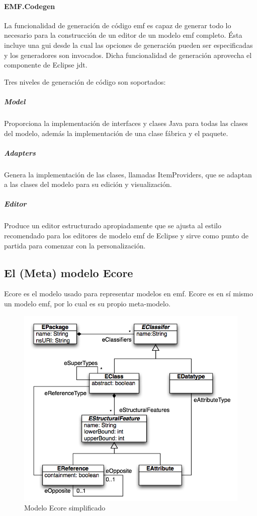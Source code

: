 \documentclass[a4paper,12pt,oneside,spanish]{book}
\begin{document}
\paragraph{EMF.Codegen}

La funcionalidad de generación de código \gls{emf} es capaz de generar todo lo necesario para la construcción de un editor de un modelo \gls{emf} completo. Ésta incluye una \gls{gui} desde la cual las opciones de generación pueden ser especificadas y los generadores son invocados. Dicha funcionalidad de generación aprovecha el componente de Eclipse \gls{jdt}.

Tres niveles de generación de código son soportados:

\subparagraph{Model}

Proporciona la implementación de interfaces y clases Java para todas las clases del modelo, además la implementación de una clase fábrica y el paquete.

\subparagraph{Adapters}

Genera la implementación de las clases, llamadas ItemProviders, que se adaptan a las clases del modelo para su edición y visualización.

\subparagraph{Editor}

Produce un editor estructurado apropiadamente que se ajusta al estilo recomendado para los editores de modelo \gls{emf} de Eclipse y sirve como punto de partida para comenzar con la personalización.

\subsection{El (Meta) modelo Ecore}

Ecore es el modelo usado para representar modelos en \gls{emf}. Ecore es en sí mismo un modelo \gls{emf}, por lo cual es su propio meta-modelo. 

\begin{figure}[hbtp]
\centering
\includegraphics[scale=1]{./img/Ecore}
\caption{Modelo Ecore simplificado}
\label{fig:EcoreModel}
\end{figure}
\end{document}
